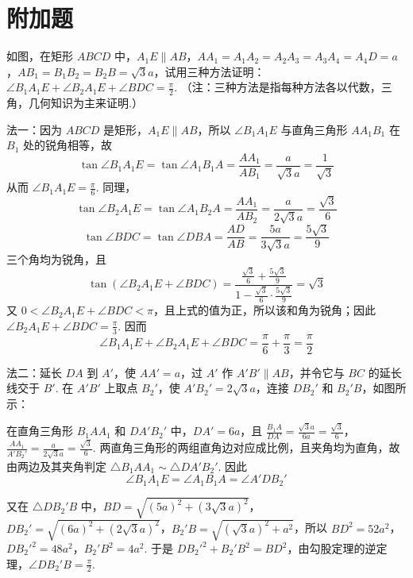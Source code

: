 \section{附加题}

\begin{problem}
如图，在矩形 \(ABCD\) 中，\(A_1E\parallel AB\)，\(AA_1=A_1A_2=A_2A_3=A_3A_4=A_4D=a\)，\(AB_1=B_1B_2=B_2B=\sqrt{3}a\)，试用三种方法证明：\(\angle B_1A_1E+\angle B_2A_1E+\angle BDC=\frac{\pi}{2}\).
（注：三种方法是指每种方法各以代数，三角，几何知识为主来证明.）

\end{problem}

\begin{solution}
法一：因为 \(ABCD\) 是矩形，\(A_1E\parallel AB\)，所以 \(\angle B_1A_1E\) 与直角三角形 \(AA_1B_1\) 在 \(B_1\) 处的锐角相等，故
\[
\tan\angle B_1A_1E=\tan\angle A_1B_1A=\frac{AA_1}{AB_1}=\frac{a}{\sqrt{3}a}=\frac{1}{\sqrt{3}}
\]
从而 \(\angle B_1A_1E=\frac{\pi}{6}\). 同理，
\[
\tan\angle B_2A_1E=\tan\angle A_1B_2A=\frac{AA_1}{AB_2}=\frac{a}{2\sqrt{3}a}=\frac{\sqrt{3}}{6}
\]
\[
\tan\angle BDC=\tan\angle DBA=\frac{AD}{AB}=\frac{5a}{3\sqrt{3}a}=\frac{5\sqrt{3}}{9}
\]
三个角均为锐角，且
\[
\tan\left( \angle B_2A_1E+\angle BDC \right)
=\frac{\frac{\sqrt{3}}{6}+\frac{5\sqrt{3}}{9}}{1-\frac{\sqrt{3}}{6}\cdot\frac{5\sqrt{3}}{9}}
=\sqrt{3}
\]
又 \(0<\angle B_2A_1E+\angle BDC<\pi\)，且上式的值为正，所以该和角为锐角；因此 \(\angle B_2A_1E+\angle BDC=\frac{\pi}{3}\). 因而
\[
\angle B_1A_1E+\angle B_2A_1E+\angle BDC
=\frac{\pi}{6}+\frac{\pi}{3}=\frac{\pi}{2}
\]

法二：延长 \(DA\) 到 \(A'\)，使 \(AA'=a\)，过 \(A'\) 作 \(A'B'\parallel AB\)，并令它与 \(BC\) 的延长线交于 \(B'\). 在 \(A'B'\) 上取点 \(B_2'\)，使 \(A'B_2'=2\sqrt{3}a\)，连接 \(DB_2'\) 和 \(B_2'B\)，如图所示：


在直角三角形 \(B_1AA_1\) 和 \(DA'B_2'\) 中，\(DA'=6a\)，且
\(\frac{B_1A}{DA'}=\frac{\sqrt{3}a}{6a}=\frac{\sqrt{3}}{6}\)，\(\frac{AA_1}{A'B_2'}=\frac{a}{2\sqrt{3}a}=\frac{\sqrt{3}}{6}\).
两直角三角形的两组直角边对应成比例，且夹角均为直角，故由两边及其夹角判定 \(\triangle B_1AA_1\sim\triangle DA'B_2'\). 因此
\[
\angle B_1A_1E=\angle A_1B_1A=\angle A'DB_2'
\]

又在 \(\triangle DB_2'B\) 中，\(BD=\sqrt{\left(5a\right)^2+\left(3\sqrt{3}a\right)^2}\)，\(DB_2'=\sqrt{\left(6a\right)^2+\left(2\sqrt{3}a\right)^2}\)，\(B_2'B=\sqrt{\left(\sqrt{3}a\right)^2+a^2}\)，所以
\(BD^2=52a^2\)，\(DB_2'^2=48a^2\)，\(B_2'B^2=4a^2\).
于是 \(DB_2'^2+B_2'B^2=BD^2\)，由勾股定理的逆定理，\(\angle DB_2'B=\frac{\pi}{2}\).


\end{solution}

